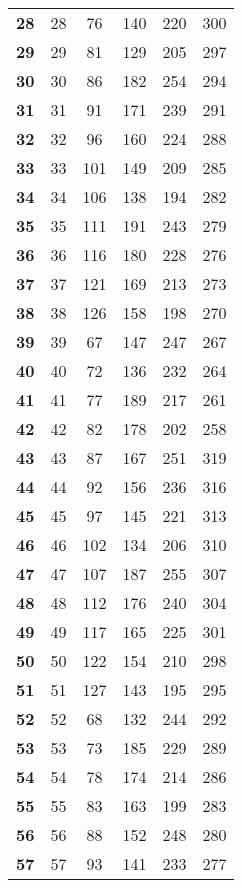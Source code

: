 \begin{longtable}{|l|c|c|c|c|c|}
    \textbf{28} & 28 & 76 & 140 & 220 & 300 \\
    \textbf{29} & 29 & 81 & 129 & 205 & 297 \\
    \textbf{30} & 30 & 86 & 182 & 254 & 294 \\
    \textbf{31} & 31 & 91 & 171 & 239 & 291 \\
    \textbf{32} & 32 & 96 & 160 & 224 & 288 \\
    \textbf{33} & 33 & 101 & 149 & 209 & 285 \\
    \textbf{34} & 34 & 106 & 138 & 194 & 282 \\
    \textbf{35} & 35 & 111 & 191 & 243 & 279 \\
    \textbf{36} & 36 & 116 & 180 & 228 & 276 \\
    \textbf{37} & 37 & 121 & 169 & 213 & 273 \\
    \textbf{38} & 38 & 126 & 158 & 198 & 270 \\
    \textbf{39} & 39 & 67 & 147 & 247 & 267 \\
    \textbf{40} & 40 & 72 & 136 & 232 & 264 \\
    \textbf{41} & 41 & 77 & 189 & 217 & 261 \\
    \textbf{42} & 42 & 82 & 178 & 202 & 258 \\
    \textbf{43} & 43 & 87 & 167 & 251 & 319 \\
    \textbf{44} & 44 & 92 & 156 & 236 & 316 \\
    \textbf{45} & 45 & 97 & 145 & 221 & 313 \\
    \textbf{46} & 46 & 102 & 134 & 206 & 310 \\
    \textbf{47} & 47 & 107 & 187 & 255 & 307 \\
    \textbf{48} & 48 & 112 & 176 & 240 & 304 \\
    \textbf{49} & 49 & 117 & 165 & 225 & 301 \\
    \textbf{50} & 50 & 122 & 154 & 210 & 298 \\
    \textbf{51} & 51 & 127 & 143 & 195 & 295 \\
    \textbf{52} & 52 & 68 & 132 & 244 & 292 \\
    \textbf{53} & 53 & 73 & 185 & 229 & 289 \\
    \textbf{54} & 54 & 78 & 174 & 214 & 286 \\
    \textbf{55} & 55 & 83 & 163 & 199 & 283 \\
    \textbf{56} & 56 & 88 & 152 & 248 & 280 \\
    \textbf{57} & 57 & 93 & 141 & 233 & 277 \\

\end{longtable}

